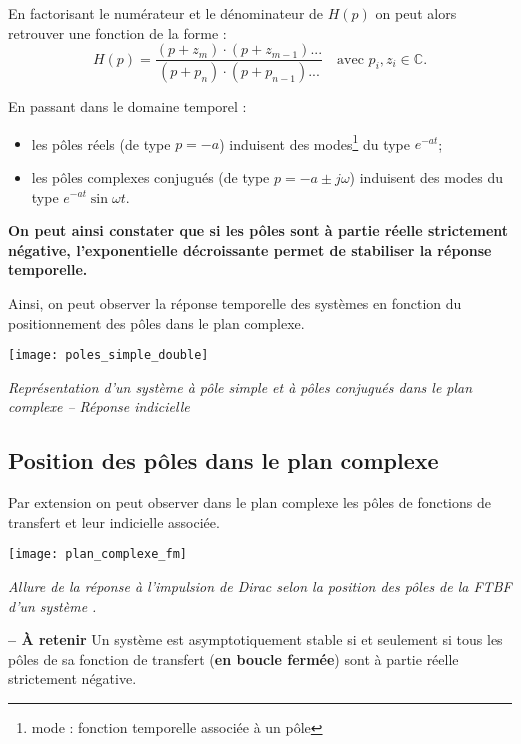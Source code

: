 En factorisant le numérateur et le dénominateur de $H(p)$ on peut alors retrouver une fonction de la forme  :
$$
H(p)=\dfrac{\left(p+ z_m\right)\cdot \left(p+ z_{m-1}\right)...}{\left(p+ p_n\right)\cdot \left(p+ p_{n-1}\right)...} \quad \text{avec } p_i,z_i\in \mathbb{C}.
$$

En passant dans le domaine temporel : 
\begin{itemize}
\item les pôles réels (de type $p=-a$) induisent des modes\footnote{mode : fonction temporelle associée à un pôle} du type $e^{-at}$;
\item les pôles complexes conjugués (de type $p=-a\pm j\omega$) induisent des modes du type 
$e^{-at} \sin \omega t$.
\end{itemize}

\textbf{On peut ainsi constater que si les pôles sont à partie réelle strictement négative, l'exponentielle décroissante permet de stabiliser la réponse temporelle.}

Ainsi, on peut observer la réponse temporelle des systèmes en fonction du positionnement des pôles dans le plan complexe. 

\begin{center}
\texttt{[image: poles\_simple\_double]}

\textit{Représentation d'un système à pôle simple et à pôles conjugués dans le plan complexe -- Réponse indicielle}
\end{center}

\subsection{Position des pôles dans le plan complexe}
Par extension on peut observer dans le plan complexe les pôles de fonctions de transfert et leur indicielle associée.

\begin{center}
\texttt{[image: plan\_complexe\_fm]}

\textit{Allure de la réponse à l’impulsion de Dirac selon la position des pôles de la FTBF d’un système \cite{2}.}
\end{center}

\begin{defi}\textbf{ -- À retenir}
Un système est asymptotiquement stable si et seulement si tous les pôles de sa fonction de transfert (\textbf{en boucle fermée}) sont à partie réelle strictement négative. 

\end{defi}

